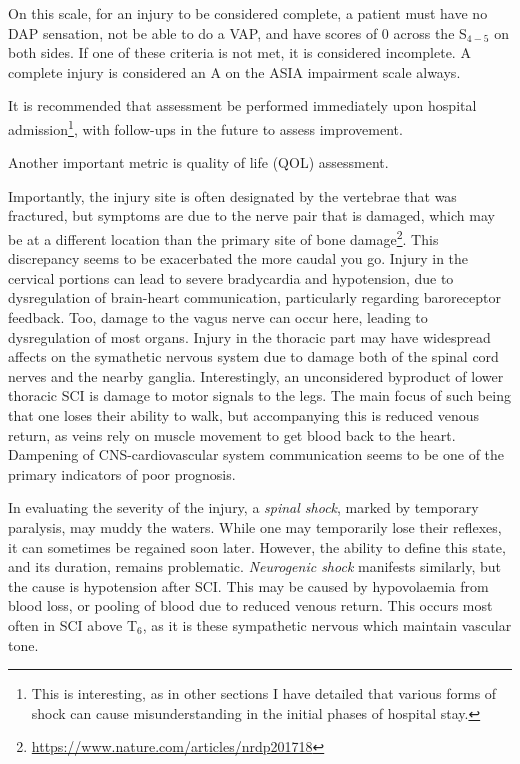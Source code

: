 On this scale, for an injury to be considered complete, a patient must have no DAP sensation, not be able to do a VAP, and have scores of 0 across the S$_{4-5}$ on both sides. If one of these criteria is not met, it is considered incomplete. A complete injury is considered an A on the ASIA impairment scale always. 



It is recommended that assessment be performed immediately upon hospital admission\footnote{This is interesting, as in other sections I have detailed that various forms of shock can cause misunderstanding in the initial phases of hospital stay.}, with follow-ups in the future to assess improvement. 







Another important metric is quality of life (QOL) assessment.\newline 

Importantly, the injury site is often designated by the vertebrae that was fractured, but symptoms are due to the nerve pair that is damaged, which may be at a different location than the primary site of bone damage\footnote{\url{https://www.nature.com/articles/nrdp201718}}. This discrepancy seems to be exacerbated the more caudal you go. Injury in the cervical portions can lead to severe bradycardia and hypotension, due to dysregulation of brain-heart communication, particularly regarding baroreceptor feedback. Too, damage to the vagus nerve can occur here, leading to dysregulation of most organs. Injury in the thoracic part may have widespread affects on the symathetic nervous system due to damage both of the spinal cord nerves and the nearby ganglia. Interestingly, an unconsidered byproduct of lower thoracic SCI is damage to motor signals to the legs. The main focus of such being that one loses their ability to walk, but accompanying this is reduced venous return, as veins rely on muscle movement to get blood back to the heart. Dampening of CNS-cardiovascular system communication seems to be one of the primary indicators of poor prognosis.\newline

In evaluating the severity of the injury, a \textit{spinal shock}, marked by temporary paralysis, may muddy the waters. While one may temporarily lose their reflexes, it can sometimes be regained soon later. However, the ability to define this state, and its duration, remains problematic. \textit{Neurogenic shock} manifests similarly, but the cause is hypotension after SCI. This may be caused by hypovolaemia from blood loss, or pooling of blood due to reduced venous return. This occurs most often in SCI above T$_6$, as it is these sympathetic nervous which maintain vascular tone.\newline

